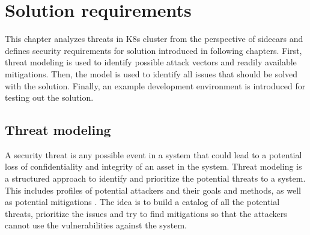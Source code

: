 \documentclass[english, 12pt, a4paper, sci, utf8, a-2b, online]{aaltothesis}
\begin{document}
\clearpage

\section{Solution requirements} \label{sec:methods}

This chapter analyzes threats in K8s cluster from the perspective of sidecars and defines security requirements for solution introduced in following chapters. First, threat modeling is used to identify possible attack vectors and readily available mitigations. Then, the model is used to identify all issues that should be solved with the solution. Finally, an example development environment is introduced for testing out the solution.

\subsection{Threat modeling}




A security threat is any possible event in a system that could lead to a potential loss of confidentiality and integrity of an asset in the system. Threat modeling is a structured approach to identify and prioritize the potential threats to a system. This includes profiles of potential attackers and their goals and methods, as well as potential mitigations \cite{shevchenko2018threat}. The idea is to build a catalog of all the potential threats, prioritize the issues and try to find mitigations so that the attackers cannot use the vulnerabilities against the system.
\end{document}
